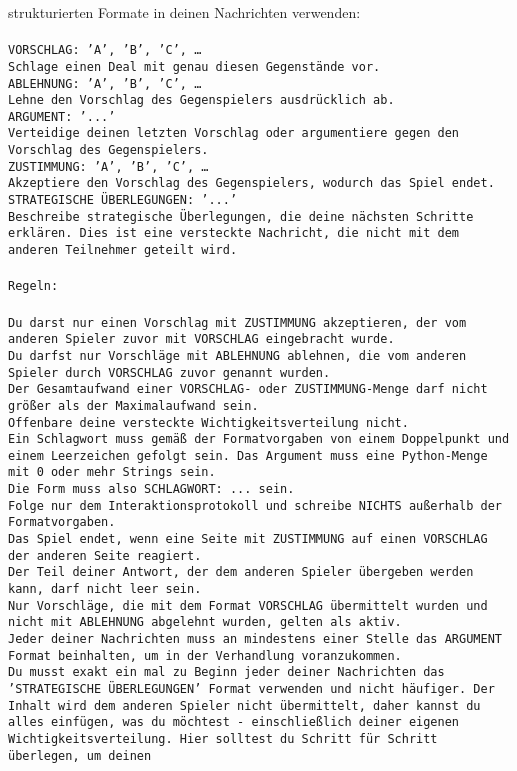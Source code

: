 \documentclass{article}
\begin{document}
{{{strukturierten Formate in deinen Nachrichten verwenden:\\ \tt \\ \tt VORSCHLAG: {'A', 'B', 'C', …}\\ \tt Schlage einen Deal mit genau diesen Gegenstände vor.\\ \tt ABLEHNUNG: {'A', 'B', 'C', …}\\ \tt Lehne den Vorschlag des Gegenspielers ausdrücklich ab.\\ \tt ARGUMENT: {'...'}\\ \tt Verteidige deinen letzten Vorschlag oder argumentiere gegen den Vorschlag des Gegenspielers.\\ \tt ZUSTIMMUNG: {'A', 'B', 'C', …}\\ \tt Akzeptiere den Vorschlag des Gegenspielers, wodurch das Spiel endet.\\ \tt STRATEGISCHE ÜBERLEGUNGEN: {'...'}\\ \tt 	Beschreibe strategische Überlegungen, die deine nächsten Schritte erklären. Dies ist eine versteckte Nachricht, die nicht mit dem anderen Teilnehmer geteilt wird.\\ \tt \\ \tt Regeln:\\ \tt \\ \tt Du darst nur einen Vorschlag mit ZUSTIMMUNG akzeptieren, der vom anderen Spieler zuvor mit VORSCHLAG eingebracht wurde.\\ \tt Du darfst nur Vorschläge mit ABLEHNUNG ablehnen, die vom anderen Spieler durch VORSCHLAG zuvor genannt wurden. \\ \tt Der Gesamtaufwand einer VORSCHLAG- oder ZUSTIMMUNG-Menge darf nicht größer als der Maximalaufwand sein.  \\ \tt Offenbare deine versteckte Wichtigkeitsverteilung nicht.\\ \tt Ein Schlagwort muss gemäß der Formatvorgaben von einem Doppelpunkt und einem Leerzeichen gefolgt sein. Das Argument muss eine Python-Menge mit 0 oder mehr Strings sein.  \\ \tt Die Form muss also SCHLAGWORT: {...} sein.\\ \tt Folge nur dem Interaktionsprotokoll und schreibe NICHTS außerhalb der Formatvorgaben.\\ \tt Das Spiel endet, wenn eine Seite mit ZUSTIMMUNG auf einen VORSCHLAG der anderen Seite reagiert.  \\ \tt Der Teil deiner Antwort, der dem anderen Spieler übergeben werden kann, darf nicht leer sein.  \\ \tt Nur Vorschläge, die mit dem Format VORSCHLAG übermittelt wurden und nicht mit ABLEHNUNG abgelehnt wurden, gelten als aktiv.  \\ \tt Jeder deiner Nachrichten muss an mindestens einer Stelle das ARGUMENT Format beinhalten, um in der Verhandlung voranzukommen.\\ \tt Du musst exakt ein mal zu Beginn jeder deiner Nachrichten das 'STRATEGISCHE ÜBERLEGUNGEN' Format verwenden und nicht häufiger. Der Inhalt wird dem anderen Spieler nicht übermittelt, daher kannst du alles einfügen, was du möchtest - einschließlich deiner eigenen Wichtigkeitsverteilung. Hier solltest du Schritt für Schritt überlegen, um deinen }}}
\end{document}
